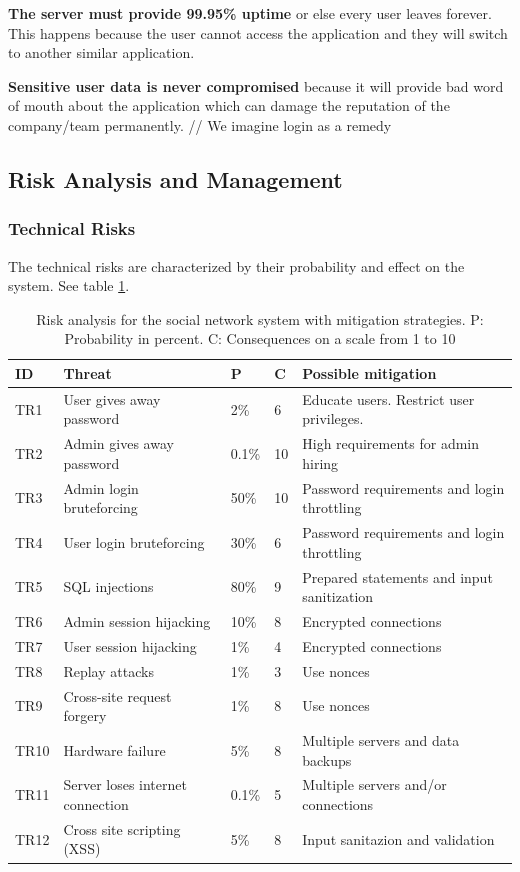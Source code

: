 \documentclass[a4paper]{article}
\begin{document}
\textbf{The server must provide 99.95\% uptime} or else every user leaves forever. This happens because the user cannot access the application and they will switch to another similar application.

\textbf{Sensitive user data is never compromised} because it will provide bad word of mouth about the application which can damage the reputation of the company/team permanently.
// We imagine login as a remedy

\subsection{Risk Analysis and Management}

\subsubsection{Technical Risks}
The technical risks are characterized by their probability and effect on the system. See table \ref{tab:risk_analysis}.

\begin{table}[h!]
	\begin{tabular}{| l | p{4cm} | l | l | p{5cm} |}
		\hline
		\textbf{ID} & \textbf{Threat} & \textbf{P} & \textbf{C} & \textbf{Possible mitigation} \\ \hline
		TR1 & User gives away password & 2\% & 6 & Educate users. Restrict user privileges. \\ \hline
        TR2 & Admin gives away password & 0.1\%  & 10 & High requirements for admin hiring \\ \hline
        TR3 & Admin login bruteforcing & 50\% & 10 & Password requirements and login throttling \\ \hline
        TR4 & User login bruteforcing & 30\% & 6 & Password requirements and login throttling \\ \hline
        TR5 & SQL injections & 80\% & 9 & Prepared statements and input sanitization \\ \hline
        TR6 & Admin session hijacking & 10\% & 8 & Encrypted connections \\ \hline
        TR7 & User session hijacking & 1\% & 4 & Encrypted connections \\ \hline
        TR8 & Replay attacks & 1\% & 3 & Use nonces \\ \hline
       	TR9 & Cross-site request forgery & 1\% & 8 & Use nonces \\ \hline
        TR10 & Hardware failure & 5\% & 8 & Multiple servers and data backups \\ \hline
        TR11 & Server loses internet connection & 0.1\% & 5 & Multiple servers and/or connections \\ \hline
        TR12 & Cross site scripting (XSS) & 5\% & 8 & Input sanitazion and validation \\ \hline
	\end{tabular}
	\caption{Risk analysis for the social network system with mitigation strategies. P: Probability in percent. C: Consequences on a scale from 1 to 10}
	\label{tab:risk_analysis}
\end{table}
\end{document}
